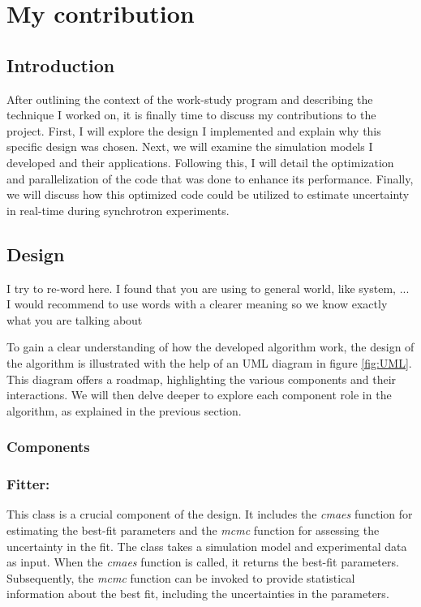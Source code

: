 \section{My contribution}

\subsection{Introduction}

After outlining the context of the work-study program and describing the technique I worked
on, it is finally time to discuss my contributions to the project. First, I will explore 
the design I implemented and explain why this specific design was chosen. Next, we will 
examine the simulation models I developed and their applications. Following this, I will 
detail the optimization and parallelization of the code that was done to enhance its performance. 
Finally, we will discuss how this optimized code could be utilized to estimate uncertainty
in real-time during synchrotron experiments.

\subsection{Design}

\color{red} I try to re-word here. I found that you are using to general world, like system, ...
I would recommend to use words with a clearer meaning so we know exactly what you are talking about \color{black}

To gain a clear understanding of how the developed algorithm work, the design of the algorithm is illustrated with the help of an 
UML diagram in figure \ref{fig:UML}. This diagram offers a roadmap, highlighting the various components and their interactions.
We will then delve deeper to explore each component role in the algorithm, as explained in the previous section.
\subsubsection{Components}

\subsubsection*{\textbf{Fitter:}}
This class is a crucial component of the design. It includes the \textit{cmaes} function for estimating the
best-fit parameters and the \textit{mcmc} function for assessing the uncertainty in the fit. The class takes
a simulation model and experimental data as input. When the \textit{cmaes} function is called, it returns the best-fit parameters.
Subsequently, the \textit{mcmc} function can be invoked to provide statistical information about the best
fit, including the uncertainties in the parameters.

